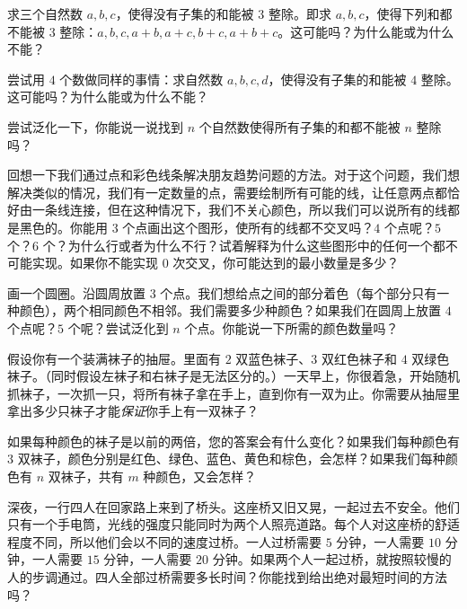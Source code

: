 \begin{exercise}
    求三个自然数 $a,b,c$，使得没有子集的和能被 $3$ 整除。即求 $a,b,c$，使得下列和都不能被 $3$ 整除：$a,b,c,a + b,a + c,b + c,a + b + c$。这可能吗？为什么能或为什么不能？

    尝试用 $4$ 个数做同样的事情：求自然数 $a,b,c,d$，使得没有子集的和能被 $4$ 整除。这可能吗？为什么能或为什么不能？

    尝试泛化一下，你能说一说找到 $n$ 个自然数使得所有子集的和都不能被 $n$ 整除吗？
\end{exercise}

\begin{exercise}
    回想一下我们通过点和彩色线条解决朋友趋势问题的方法。对于这个问题，我们想解决类似的情况，我们有一定数量的点，需要绘制所有可能的线，让任意两点都恰好由一条线连接，但在这种情况下，我们不关心颜色，所以我们可以说所有的线都是黑色的。你能用 $3$ 个点画出这个图形，使所有的线都不交叉吗？$4$ 个点呢？$5$ 个？$6$ 个？为什么行或者为什么不行？试着解释为什么这些图形中的任何一个都不可能实现。如果你不能实现 $0$ 次交叉，你可能达到的最小数量是多少？
\end{exercise}

\begin{exercise}
    画一个圆圈。沿圆周放置 $3$ 个点。我们想给点之间的部分着色（每个部分只有一种颜色），两个相同颜色不相邻。我们需要多少种颜色？如果我们在圆周上放置 $4$ 个点呢？$5$ 个呢？尝试泛化到 $n$ 个点。你能说一下所需的颜色数量吗？
\end{exercise}

\begin{exercise}
    假设你有一个装满袜子的抽屉。里面有 $2$ 双蓝色袜子、$3$ 双红色袜子和 $4$ 双绿色袜子。（同时假设左袜子和右袜子是无法区分的。）一天早上，你很着急，开始随机抓袜子，一次抓一只，将所有袜子拿在手上，直到你有一双为止。你需要从抽屉里拿出多少只袜子才能\textit{保证}你手上有一双袜子？

    如果每种颜色的袜子是以前的两倍，您的答案会有什么变化？如果我们每种颜色有 $3$ 双袜子，颜色分别是红色、绿色、蓝色、黄色和棕色，会怎样？如果我们每种颜色有 $n$ 双袜子，共有 $m$ 种颜色，又会怎样？
\end{exercise}

\begin{exercise}
    深夜，一行四人在回家路上来到了桥头。这座桥又旧又晃，一起过去不安全。他们只有一个手电筒，光线的强度只能同时为两个人照亮道路。每个人对这座桥的舒适程度不同，所以他们会以不同的速度过桥。一人过桥需要 $5$ 分钟，一人需要 $10$ 分钟，一人需要 $15$ 分钟，一人需要 $20$ 分钟。如果两个人一起过桥，就按照较慢的人的步调通过。四人全部过桥需要多长时间？你能找到给出绝对最短时间的方法吗？
\end{exercise}

